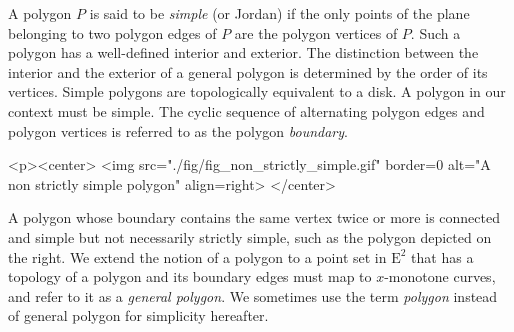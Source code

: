 A polygon $P$ is said to be {\em simple} (or Jordan) if the
only points of the plane belonging to two polygon edges of $P$ are the
polygon vertices of $P$. Such a polygon has a well-defined interior
and exterior. The distinction between the interior and  the exterior of a
general polygon is determined by the order of its vertices. Simple polygons 
are topologically equivalent to a disk. A polygon in our context must be 
simple. The cyclic sequence of alternating polygon edges and polygon vertices 
is referred to as the polygon {\em boundary}. 
\lcTex{%
  \setlength{\widthRight}{1.4cm}
  \setlength{\widthLeft}{\widthLineReal}
  \addtolength{\widthLeft}{-\widthRight}
  \begin{minipage}{\widthLeft}
}
\label{fig:non_strictly_simple_polygon}
\begin{ccHtmlOnly}
  <p><center>
    <img src="./fig/fig_non_strictly_simple.gif" border=0 alt="A non strictly simple polygon" align=right>
  </center>
\end{ccHtmlOnly}
A polygon whose boundary 
contains the same vertex twice or more is connected and simple but not
necessarily strictly simple, such as the polygon depicted on the right. 
We extend the notion of a polygon to a point set in $\mathrm{E}^2$ that has 
a topology of a polygon and its boundary edges must map to $x$-monotone
curves, and refer to it as a {\em general polygon}. We sometimes use
the term {\em polygon} instead of general polygon for simplicity hereafter.

